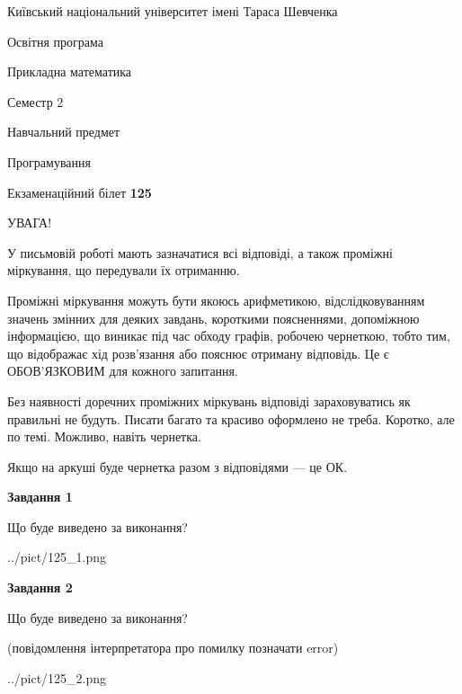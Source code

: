 \documentclass[12pt, ukrainian]{article}
\begin{document}
{{\begin {small}\par
{ \center  Київський національний університет імені Тараса Шевченка \par}
{\parbox {5 cm}{Освітня програма \hfill}{\parbox {7 cm}{Прикладна математика\hfill}}\parbox {6 cm}{\hfill Семестр 2}}\par
{\parbox {5 cm} {Навчальний предмет \hfill}\parbox {7 cm}{Програмування \hfill}\parbox {6cm}{\hfill}\par}\vspace{-7pt} \end{small}}{\center Екзаменаційний білет \No \textbf
{ 125 }\par}}
{
\begin {large}
УВАГА!

У письмовій роботі мають зазначатися всі відповіді, а також проміжні міркування, що передували їх отриманню.

Проміжні міркування можуть бути якоюсь арифметикою, відслідковуванням зна\-чень змінних для деяких завдань,
короткими поясненнями, допоміжною інформацією, що виникає під час обходу графів, робочею чернеткою,
тобто тим, що відображає хід розв’язання або пояснює отриману відповідь.
Це є ОБОВ’ЯЗКОВИМ для кожного запитання.

Без наявності доречних проміжних міркувань відповіді зараховуватись як правиль\-ні не будуть.
Писати багато та красиво оформлено не треба. Коротко, але по темі. Можли\-во, навіть чернетка.

Якщо на аркуші буде чернетка разом з відповідями --- це ОК.

\newpage

{\begin {center}\textbf{Завдання 1}\end {center}}\par
Що буде виведено за виконання?\par
\begin{center}
	{../pict/125_1.png}
\end{center}
\newpage

{\begin {center}\textbf{Завдання 2}\end {center}}\par
Що буде виведено за виконання?\par
 (повідомлення інтерпретатора про помилку позначати error)\par
\begin{center}
	{../pict/125_2.png}
\end{center}
\newpage


\end{large}}
\end{document}
